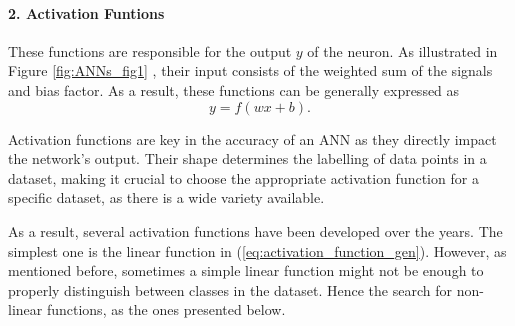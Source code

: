 \paragraph{2. Activation Funtions}
These functions are responsible for the output $y$ of the neuron. As illustrated in Figure \ref{fig:ANNs_fig1} , their input consists of the weighted sum of the signals and bias factor. As a result, these functions can be generally expressed as 
\begin{equation}
    \label{eq:activation_function_gen}
    y = f (  w x + b ) .
\end{equation}

Activation functions are key in the accuracy of an \gls{ANN} as they directly impact the network's output. Their shape determines the labelling of data points in a dataset, making it crucial to choose the appropriate activation function for a specific dataset, as there is a wide variety available.

As a result, several activation functions have been developed over the years. The simplest one is the linear function in (\ref{eq:activation_function_gen}). However, as mentioned before, sometimes a simple linear function might not be enough to properly distinguish between classes in the dataset. Hence the search for non-linear functions, as the ones presented below. 

